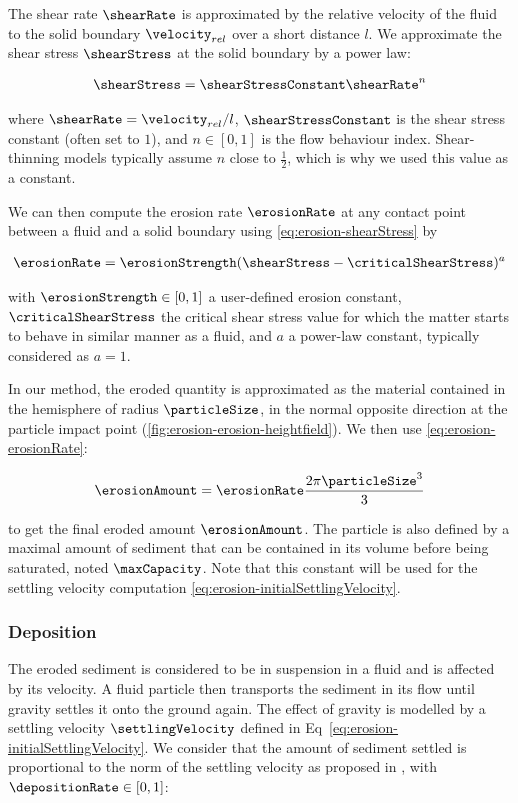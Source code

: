 The shear rate $\shearRate$ is approximated by the relative velocity of the fluid to the solid boundary $\velocity_{rel}$ over a short distance $l$.
We approximate the shear stress $\shearStress$ at the solid boundary by a power law:

\begin{align}\label{eq:erosion-shearStress}
    \shearStress = \shearStressConstant \shearRate^n
\end{align}

where $\shearRate = \velocity_{rel}/l$, $\shearStressConstant$ is the shear stress constant (often set to $1$), and $n \in [0,1]$ is the flow behaviour index. Shear-thinning models typically assume $n$ close to $\frac{1}{2}$, which is why we used this value as a constant.  

We can then compute the erosion rate $\erosionRate$ at any contact point between a fluid and a solid boundary using \eqref{eq:erosion-shearStress} by 

\begin{align}\label{eq:erosion-erosionRate}
    \erosionRate = \erosionStrength (\shearStress - \criticalShearStress)^a
\end{align}

with $\erosionStrength \in [0,1]$ a user-defined erosion constant, $\criticalShearStress$ the critical shear stress value for which the matter starts to behave in similar manner as a fluid, and $a$ a power-law constant, typically considered as $a = 1$. 

In our method, the eroded quantity is approximated as the material contained in the hemisphere of radius $\particleSize$, in the normal opposite direction at the particle impact point (\cref{fig:erosion-erosion-heightfield}). We then use \eqref{eq:erosion-erosionRate}: 

\begin{align}
    \label{eq:erosion-erosionAmount} 
    \erosionAmount = \erosionRate \frac{ 2 \pi \particleSize^3 }{ 3 }
\end{align}

to get the final eroded amount $\erosionAmount$. The particle is also defined by a maximal amount of sediment that can be contained in its volume before being saturated, noted $\maxCapacity$. Note that this constant will be used for the settling velocity computation \eqref{eq:erosion-initialSettlingVelocity}.

\subsubsection{Deposition}
The eroded sediment is considered to be in suspension in a fluid and is affected by its velocity. A fluid particle then transports the sediment in its flow until gravity settles it onto the ground again. The effect of gravity is modelled by a settling velocity $\settlingVelocity$ defined in Eq~\eqref{eq:erosion-initialSettlingVelocity}. We consider that the amount of sediment settled is proportional to the norm of the settling velocity as proposed in \cite{Wojtan2007}, with $\depositionRate \in [0,1]$: 

